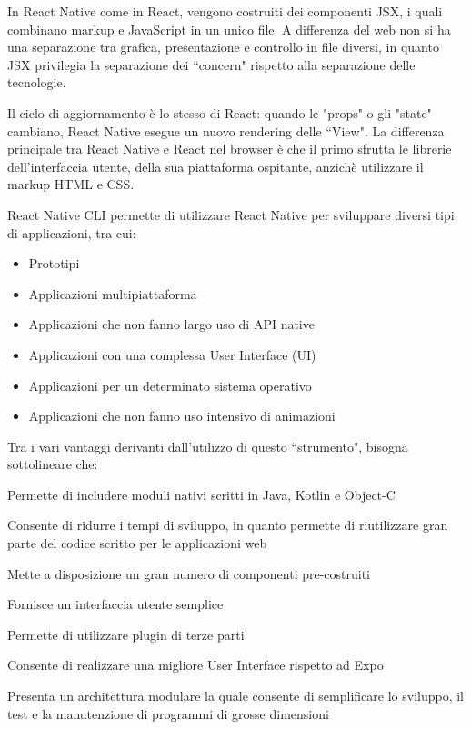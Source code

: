 In React Native come in React, vengono costruiti dei componenti JSX, i quali combinano markup e JavaScript in un unico file. A differenza del web non
si ha una separazione tra grafica, presentazione e controllo in file diversi, in quanto JSX privilegia la separazione dei ``concern" rispetto alla
separazione delle tecnologie.

Il ciclo di aggiornamento \`e lo stesso di React: quando le "props"  o gli "state" cambiano, React Native esegue un nuovo rendering delle ``View".
La differenza principale tra React Native e React nel browser \`e che il primo sfrutta le librerie dell'interfaccia utente, della sua piattaforma ospitante,
anzich\`e utilizzare il markup HTML e CSS.

React Native CLI permette di utilizzare React Native per sviluppare diversi tipi di applicazioni, tra cui:
\begin{itemize}
      \item Prototipi
      \item Applicazioni multipiattaforma
      \item Applicazioni che non fanno largo uso di API native
      \item Applicazioni con una complessa User Interface {}(UI)
      \item Applicazioni per un determinato sistema operativo
      \item Applicazioni che non fanno uso intensivo di animazioni
\end{itemize}
Tra i vari vantaggi derivanti dall'utilizzo di questo ``strumento", bisogna sottolineare che:
\begin{list}{*}{}
      \item Permette di includere moduli nativi scritti in Java, Kotlin e Object-C
      \item Consente di ridurre i tempi di sviluppo, in quanto permette di riutilizzare gran parte del codice scritto per le applicazioni web
      \item Mette a disposizione un gran numero di componenti pre-costruiti
      \item Fornisce un interfaccia utente semplice
      \item Permette di utilizzare plugin di terze parti
      \item Consente di realizzare una migliore User Interface rispetto ad Expo
      \item Presenta un architettura modulare la quale consente di semplificare lo sviluppo, il test e la manutenzione di programmi di grosse dimensioni
\end{list}

